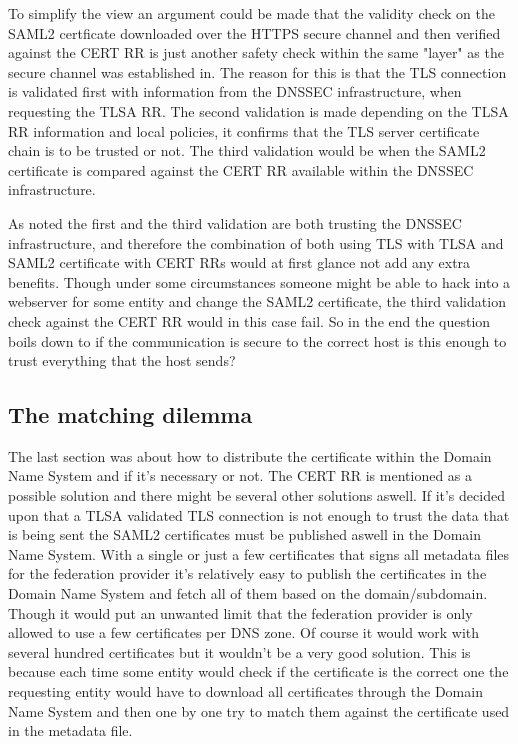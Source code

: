 To simplify the view an argument could be made that the validity check on the SAML2 certficate downloaded over the HTTPS secure channel and then verified against the CERT RR is just another safety check within the same "layer" as the secure channel was established in.
The reason for this is that the TLS connection is validated first with information from the DNSSEC infrastructure, when requesting the TLSA RR.
The second validation is made depending on the TLSA RR information and local policies, it confirms that the TLS server certificate chain is to be trusted or not.
The third validation would be when the SAML2 certificate is compared against the CERT RR available within the DNSSEC infrastructure.

As noted the first and the third validation are both trusting the DNSSEC infrastructure, and therefore the combination of both using TLS with TLSA and SAML2 certificate with CERT RRs would at first glance not add any extra benefits.
Though under some circumstances someone might be able to hack into a webserver for some entity and change the SAML2 certificate, the third validation check against the CERT RR would in this case fail.
So in the end the question boils down to if the communication is secure to the correct host is this enough to trust everything that the host sends?

\subsection{The matching dilemma}
\label{subsec:matching-dilemma}
The last section was about how to distribute the certificate within the Domain Name System and if it's necessary or not.
The CERT RR is mentioned as a possible solution and there might be several other solutions aswell.
If it's decided upon that a TLSA validated TLS connection is not enough to trust the data that is being sent the SAML2 certificates must be published aswell in the Domain Name System.
With a single or just a few certificates that signs all metadata files for the federation provider it's relatively easy to publish the certificates in the Domain Name System and fetch all of them based on the domain/subdomain.
Though it would put an unwanted limit that the federation provider is only allowed to use a few certificates per DNS zone.
Of course it would work with several hundred certificates but it wouldn't be a very good solution.
This is because each time some entity would check if the certificate is the correct one the requesting entity would have to download all certificates through the Domain Name System and then one by one try to match them against the certificate used in the metadata file.


